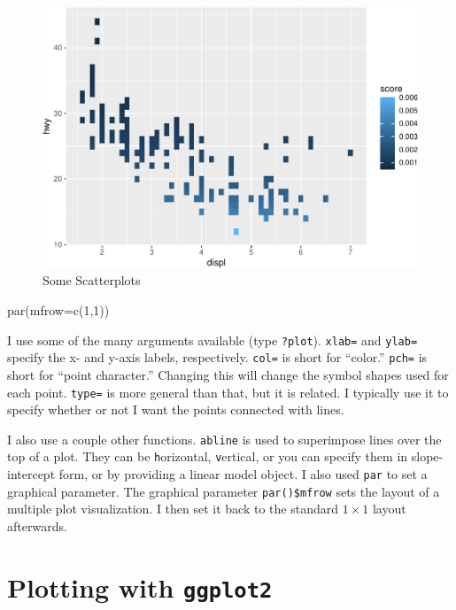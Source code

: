\documentclass[
  12pt,
  krantz2]{krantz}
\makeatletter
\newenvironment{Shaded}{\begin{snugshade}}{\end{snugshade}}
\newcommand{\AttributeTok}[1]{\textcolor[rgb]{0.61,0.61,0.61}{#1}}
\newcommand{\DecValTok}[1]{\textcolor[rgb]{0.06,0.06,0.06}{#1}}
\newcommand{\FunctionTok}[1]{\textcolor[rgb]{0,0,0}{#1}}
\newcommand{\NormalTok}[1]{#1}
\newenvironment{kframe}{%
\medskip{}
\setlength{\fboxsep}{.8em}
 \def\at@end@of@kframe{}%
 \ifinner\ifhmode%
  \def\at@end@of@kframe{\end{minipage}}%
  \begin{minipage}{\columnwidth}%
 \fi\fi%
 \def\FrameCommand##1{\hskip\@totalleftmargin \hskip-\fboxsep
 \colorbox{shadecolor}{##1}\hskip-\fboxsep
     \hskip-\linewidth \hskip-\@totalleftmargin \hskip\columnwidth}%
 \MakeFramed {\advance\hsize-\width
   \@totalleftmargin\z@ \linewidth\hsize
   \@setminipage}}%
 {\par\unskip\endMakeFramed%
 \at@end@of@kframe}
\renewenvironment{Shaded}{\begin{kframe}}{\end{kframe}}
\makeatother
\begin{document}
\begin{figure}
\centering
\includegraphics{r_and_python_book_files/figure-latex/unnamed-chunk-197-1.pdf}
\caption{\label{fig:unnamed-chunk-197}Some Scatterplots}
\end{figure}

\begin{Shaded}
\begin{Highlighting}[]
\FunctionTok{par}\NormalTok{(}\AttributeTok{mfrow=}\FunctionTok{c}\NormalTok{(}\DecValTok{1}\NormalTok{,}\DecValTok{1}\NormalTok{))}
\end{Highlighting}
\end{Shaded}

I use some of the many arguments available (type \texttt{?plot}). \texttt{xlab=} and \texttt{ylab=} specify the x- and y-axis labels, respectively. \texttt{col=} is short for ``color.'' \texttt{pch=} is short for ``point character.'' Changing this will change the symbol shapes used for each point. \texttt{type=} is more general than that, but it is related. I typically use it to specify whether or not I want the points connected with lines.

I also use a couple other functions. \texttt{abline} is used to superimpose lines over the top of a plot. They can be \texttt{h}orizontal, \texttt{v}ertical, or you can specify them in slope-intercept form, or by providing a linear model object. I also used \texttt{par} to set a graphical parameter. The graphical parameter \texttt{par()\$mfrow} sets the layout of a multiple plot visualization. I then set it back to the standard \(1 \times 1\) layout afterwards.

\hypertarget{plotting-with-ggplot2}{%
\section{\texorpdfstring{Plotting with \texttt{ggplot2}}{Plotting with ggplot2}}\label{plotting-with-ggplot2}}
\end{document}
